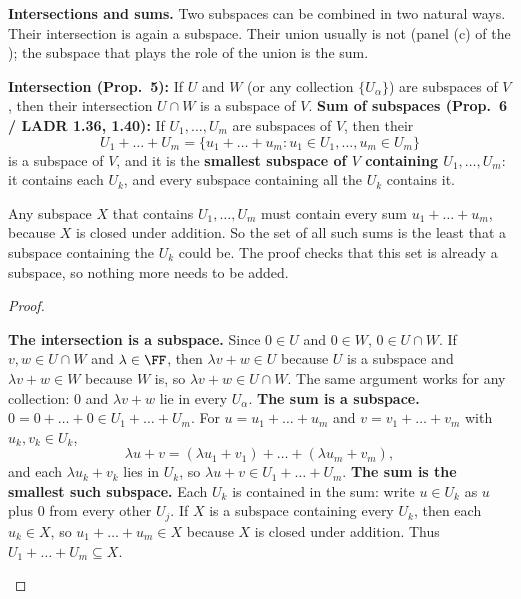 \documentclass[10pt]{scrartcl}
\begin{document}
\textbf{Intersections and sums.} Two subspaces can be combined in two natural ways. Their intersection is again a subspace. Their union usually is not (panel (c) of the ); the subspace that plays the role of the union is the sum.

\begin{proposition*}
  \begin{enumerate}[(a)]
    \ii \textbf{Intersection (Prop.~5):} If $U$ and $W$ (or any collection $\{U_\alpha\}$) are subspaces of $V$, then their intersection $U\cap W$ is a subspace of $V$.
    \ii \textbf{Sum of subspaces (Prop.~6 / LADR 1.36, 1.40):} If $U_1,\dots,U_m$ are subspaces of $V$, then their 
    \[
      U_1 + \dots + U_m = \{u_1 + \dots + u_m : u_1\in U_1,\dots,u_m\in U_m\}
    \]
    is a subspace of $V$, and it is the \textbf{smallest subspace of $V$ containing $U_1,\dots,U_m$}: it contains each $U_k$, and every subspace containing all the $U_k$ contains it.
  \end{enumerate}
\end{proposition*}
\begin{ideabox}
  Any subspace $X$ that contains $U_1,\dots,U_m$ must contain every sum $u_1+\dots+u_m$, because $X$ is closed under addition. So the set of all such sums is the least that a subspace containing the $U_k$ could be. The proof checks that this set is already a subspace, so nothing more needs to be added.
\end{ideabox}
\begin{proof}
  \begin{steps}
    \ii \textbf{The intersection is a subspace.} Since $0\in U$ and $0\in W$, $0\in U\cap W$. If $v,w\in U\cap W$ and $\lambda\in\FF$, then $\lambda v+w\in U$ because $U$ is a subspace and $\lambda v+w\in W$ because $W$ is, so $\lambda v+w\in U\cap W$. The same argument works for any collection: $0$ and $\lambda v+w$ lie in every $U_\alpha$.
    \ii \textbf{The sum is a subspace.} $0=0+\dots+0\in U_1+\dots+U_m$. For $u=u_1+\dots+u_m$ and $v=v_1+\dots+v_m$ with $u_k,v_k\in U_k$,
    \[
      \lambda u+v=(\lambda u_1+v_1)+\dots+(\lambda u_m+v_m),
    \]
    and each $\lambda u_k+v_k$ lies in $U_k$, so $\lambda u+v\in U_1+\dots+U_m$.
    \ii \textbf{The sum is the smallest such subspace.} Each $U_k$ is contained in the sum: write $u\in U_k$ as $u$ plus $0$ from every other $U_j$. If $X$ is a subspace containing every $U_k$, then each $u_k\in X$, so $u_1+\dots+u_m\in X$ because $X$ is closed under addition. Thus $U_1+\dots+U_m\subseteq X$.
  \end{steps}
\end{proof}
\end{document}
